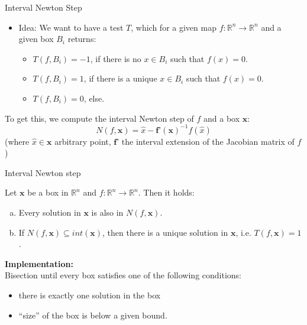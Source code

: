 \documentclass[german,10pt,xcolor=colortbl,compress,handout]{beamer}
\begin{document}
\begin{frame}{Interval Newton Step}
    \begin{itemize}
    \pause
    \item Idea: We want to have a test $T$, which for a given map $f: \mathbb{R}^n \to
        \mathbb{R}^n$ and a given box $B_i$ returns:
        \begin{itemize}
            \item $T(f,B_i)=-1$, if there is no $x \in B_i$ such that $f(x)=0$.
            \item $T(f,B_i)=1$,  if there is a unique $x \in B_i$ such that $f(x)=0$.
            \item $T(f,B_i)=0$, else.
        \end{itemize}
    \end{itemize}
    \pause
    To get this, we compute the interval Newton step of $f$ and a box $\textbf{x}$: $$
    N(f, \textbf{x})= \hat{x} - \textbf{f'}(\textbf{x})^{-1}f(\hat{x})$$ (where $\hat{x}
    \in \textbf{x}$ arbitrary point, $\textbf{f'}$ the interval extension of the Jacobian
    matrix of $f$)
\end{frame}

\begin{frame}{Interval Newton step}
    \begin{theorem}
        Let $\textbf{x}$ be a box in $\mathbb{R}^n$ and $f:\mathbb{R}^n\to \mathbb{R}^n$.
        Then it holds:
        \begin{enumerate}[a)]
            \item Every solution in $\textbf{x}$ is also in $N(f,\textbf{x})$.
                \pause
            \item If $N(f,\textbf{x}) \subseteq int(\textbf{x})$, then there is a unique
                solution in $\textbf{x}$, i.e. $T(f,\textbf{x})=1$.
        \end{enumerate}
    \end{theorem}
    \pause

    \textbf{Implementation:} \\
    Bisection until every box satisfies one of the following conditions:
    \pause
    \begin{itemize}
        \item there is exactly one solution in the box
        \item \enquote{size} of the box is below a given bound.
    \end{itemize}
\end{frame}
\end{document}
